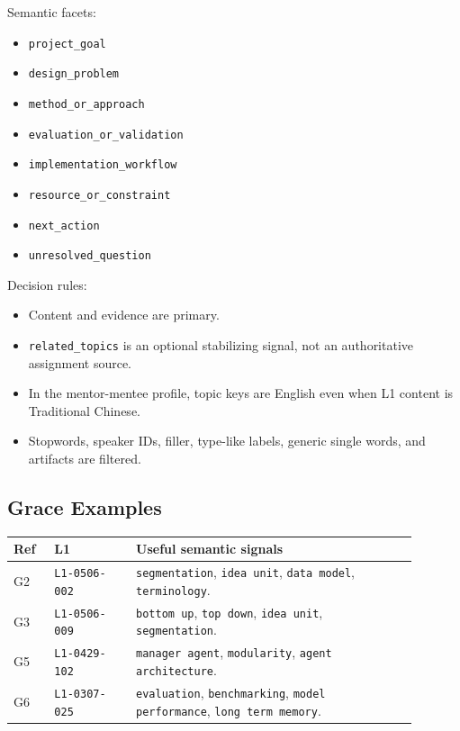 \documentclass[11pt,a4paper]{article}
\newcommand{\code}[1]{{\footnotesize\texttt{#1}}}
\begin{document}
Semantic facets:

\begin{itemize}
  \item \code{project\_goal}
  \item \code{design\_problem}
  \item \code{method\_or\_approach}
  \item \code{evaluation\_or\_validation}
  \item \code{implementation\_workflow}
  \item \code{resource\_or\_constraint}
  \item \code{next\_action}
  \item \code{unresolved\_question}
\end{itemize}

Decision rules:

\begin{itemize}
  \item Content and evidence are primary.
  \item \code{related\_topics} is an optional stabilizing signal, not an authoritative assignment source.
  \item In the mentor-mentee profile, topic keys are English even when L1 content is Traditional Chinese.
  \item Stopwords, speaker IDs, filler, type-like labels, generic single words, and artifacts are filtered.
\end{itemize}

\subsection{Grace Examples}

\begin{longtable}{>{\raggedright\arraybackslash}p{0.09\linewidth}>{\raggedright\arraybackslash}p{0.18\linewidth}>{\raggedright\arraybackslash}p{0.62\linewidth}}
\textbf{Ref} & \textbf{L1} & \textbf{Useful semantic signals} \\
\hline
G2 & \code{L1-0506-002} & \code{segmentation}, \code{idea unit}, \code{data model}, \code{terminology}. \\
G3 & \code{L1-0506-009} & \code{bottom up}, \code{top down}, \code{idea unit}, \code{segmentation}. \\
G5 & \code{L1-0429-102} & \code{manager agent}, \code{modularity}, \code{agent architecture}. \\
G6 & \code{L1-0307-025} & \code{evaluation}, \code{benchmarking}, \code{model performance}, \code{long term memory}. \\
\end{longtable}
\end{document}
